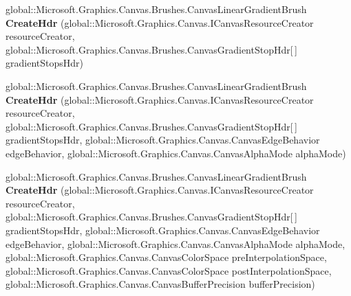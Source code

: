 \begin{DoxyCompactItemize}
global\+::\+Microsoft.\+Graphics.\+Canvas.\+Brushes.\+Canvas\+Linear\+Gradient\+Brush {\bfseries Create\+Hdr} (global\+::\+Microsoft.\+Graphics.\+Canvas.\+I\+Canvas\+Resource\+Creator resource\+Creator, global\+::\+Microsoft.\+Graphics.\+Canvas.\+Brushes.\+Canvas\+Gradient\+Stop\+Hdr\mbox{[}$\,$\mbox{]} gradient\+Stops\+Hdr)
\item 
\mbox{\label{interface_microsoft_1_1_graphics_1_1_canvas_1_1_brushes_1_1_i_canvas_linear_gradient_brush_statics_a9d2b811c75f53b8dd5784da5b0d87a96}} 
global\+::\+Microsoft.\+Graphics.\+Canvas.\+Brushes.\+Canvas\+Linear\+Gradient\+Brush {\bfseries Create\+Hdr} (global\+::\+Microsoft.\+Graphics.\+Canvas.\+I\+Canvas\+Resource\+Creator resource\+Creator, global\+::\+Microsoft.\+Graphics.\+Canvas.\+Brushes.\+Canvas\+Gradient\+Stop\+Hdr\mbox{[}$\,$\mbox{]} gradient\+Stops\+Hdr, global\+::\+Microsoft.\+Graphics.\+Canvas.\+Canvas\+Edge\+Behavior edge\+Behavior, global\+::\+Microsoft.\+Graphics.\+Canvas.\+Canvas\+Alpha\+Mode alpha\+Mode)
\item 
\mbox{\label{interface_microsoft_1_1_graphics_1_1_canvas_1_1_brushes_1_1_i_canvas_linear_gradient_brush_statics_a12d4c23a29a2ebceddbe80b2d3bd32de}} 
global\+::\+Microsoft.\+Graphics.\+Canvas.\+Brushes.\+Canvas\+Linear\+Gradient\+Brush {\bfseries Create\+Hdr} (global\+::\+Microsoft.\+Graphics.\+Canvas.\+I\+Canvas\+Resource\+Creator resource\+Creator, global\+::\+Microsoft.\+Graphics.\+Canvas.\+Brushes.\+Canvas\+Gradient\+Stop\+Hdr\mbox{[}$\,$\mbox{]} gradient\+Stops\+Hdr, global\+::\+Microsoft.\+Graphics.\+Canvas.\+Canvas\+Edge\+Behavior edge\+Behavior, global\+::\+Microsoft.\+Graphics.\+Canvas.\+Canvas\+Alpha\+Mode alpha\+Mode, global\+::\+Microsoft.\+Graphics.\+Canvas.\+Canvas\+Color\+Space pre\+Interpolation\+Space, global\+::\+Microsoft.\+Graphics.\+Canvas.\+Canvas\+Color\+Space post\+Interpolation\+Space, global\+::\+Microsoft.\+Graphics.\+Canvas.\+Canvas\+Buffer\+Precision buffer\+Precision)
\item 
\mbox{\label{interface_microsoft_1_1_graphics_1_1_canvas_1_1_brushes_1_1_i_canvas_linear_gradient_brush_statics_a10b64033cc76bb4670af23e94b8b6d1c}} 

\end{DoxyCompactItemize}
